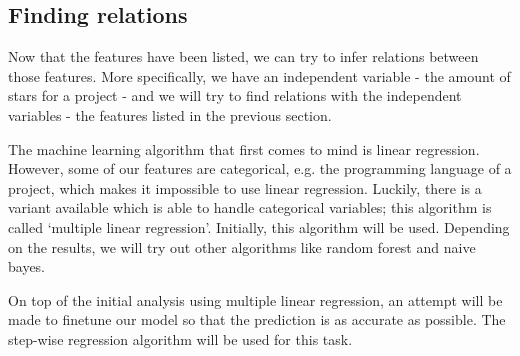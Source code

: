     
    
    \subsection{Finding relations}
        Now that the features have been listed, we can try to infer relations between those features. More specifically, we have an independent variable - the amount of stars for a project - and we will try to find relations with the independent variables - the features listed in the previous section.
        
        The machine learning algorithm that first comes to mind is linear regression. However, some of our features are categorical, e.g. the programming language of a project, which makes it impossible to use linear regression.
        Luckily, there is a variant available which is able to handle categorical variables; this algorithm is called `multiple linear regression'. 
        Initially, this algorithm will be used. Depending on the results, we will try out other algorithms like random forest and naive bayes.
        
        On top of the initial analysis using multiple linear regression, an attempt will be made to finetune our model so that the prediction is as accurate as possible. The step-wise regression algorithm will be used for this task.
    

